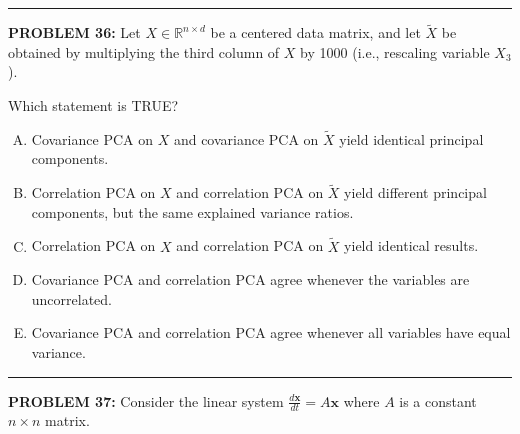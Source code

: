 \documentclass[12pt]{amsart}
\newcommand{\divider}{
  \vspace{-1em} %
  \noindent
  \raisebox{-0.15ex}{\textbullet}%
  \hspace{0.5em}%
  \rule[0.5ex]{0.95\textwidth}{1.0pt}%
  \hspace{0.5em}%
  \raisebox{-0.15ex}{\textbullet}%
  \vspace{0em} %
}
\begin{document}
{\divider


{\bf PROBLEM 36:}
% 
Let $X \in \mathbb{R}^{n \times d}$ be a centered data matrix, and let $\tilde{X}$ be obtained by multiplying the third column of $X$ by 1000 (i.e., rescaling variable $X_3$).

Which statement is TRUE?

\begin{enumerate}[(A)]
\item Covariance PCA on $X$ and covariance PCA on $\tilde{X}$ yield identical principal components.
\item Correlation PCA on $X$ and correlation PCA on $\tilde{X}$ yield different principal components, but the same explained variance ratios.
\item Correlation PCA on $X$ and correlation PCA on $\tilde{X}$ yield identical results.
\item Covariance PCA and correlation PCA agree whenever the variables are uncorrelated.
\item Covariance PCA and correlation PCA agree whenever all variables have equal variance.
\end{enumerate}

%
%

\divider


{\bf PROBLEM 37:}
% 
Consider the linear system $\displaystyle \frac{d\mathbf{x}}{dt} = A\mathbf{x}$ where $A$ is a constant $n \times n$ matrix.

}
\end{document}
